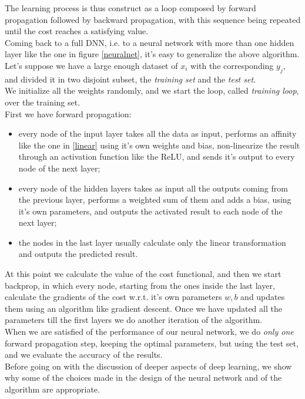 \documentclass[12pt, a4paper]{report}
\theoremstyle{definition}
\begin{document}
The learning process is thus construct as a loop composed by forward propagation followed by backward propagation, with this sequence being repeated until the cost reaches a satisfying value.\\
Coming back to a full DNN, i.e. to a neural network with more than one hidden layer like the one in figure \ref{neuralnet}, it's easy to generalize the above algorithm.\\
Let's suppose we have a large enough dataset of $x_i$ with the corresponding $y_j$, and divided it in two disjoint subset, the \textit{training set} and the \textit{test set}.\\
We initialize all the weights randomly, and we start the loop, called \textit{training loop}, over the training set.\\
First we have forward propagation:
\begin{itemize}
\item every node of the input layer takes all the data as input, performs an affinity like the one in \eqref{linear} using it's own weights and bias, non-linearize the result through an activation function like the ReLU, and sends it's output to every node of the next layer;
\item every node of the hidden layers takes as input all the outputs coming from the previous layer, performs a weighted sum of them and adds a bias, using it's own parameters, and outputs the activated result to each node of the next layer;
\item the nodes in the last layer usually calculate only the linear transformation and outputs the predicted result.
\end{itemize}
At this point we calculate the value of the cost functional, and then we start backprop, in which every node, starting from the ones inside the last layer, calculate the gradients of the cost w.r.t. it's own parameters $w,b$ and updates them using an algorithm like gradient descent. Once we have updated all the parameters till the first layers we do another iteration of the algorithm.\\
When we are satisfied of the performance of our neural network, we do \textit{only one} forward propagation step, keeping the optimal parameters, but using the test set, and we evaluate the accuracy of the results.\\
\newline
\noindent Before going on with the discussion of deeper aspects of deep learning, we show why some of the choices made in the design of the neural network and of the algorithm are appropriate.\\
\end{document}
